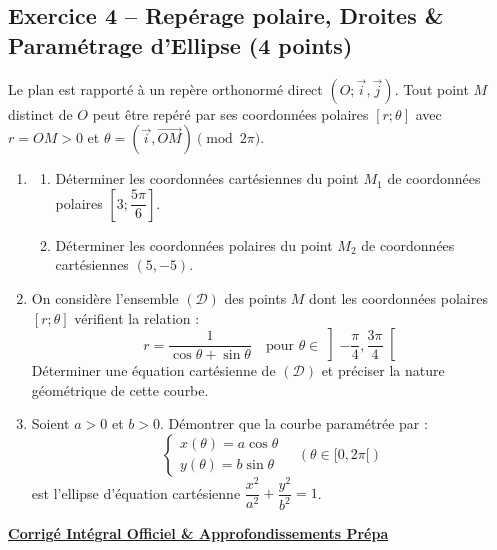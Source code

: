 \documentclass[11pt,a4paper]{article}
\begin{document}
\vspace{0.3cm}

\subsection*{Exercice 4 -- Repérage polaire, Droites \& Paramétrage d'Ellipse \hfill (4 points)}

Le plan est rapporté à un repère orthonormé direct $(O; \vec{i}, \vec{j})$. Tout point $M$ distinct de $O$ peut être repéré par ses coordonnées polaires $[r; \theta]$ avec $r = OM > 0$ et $\theta = (\vec{i}, \overrightarrow{OM}) \pmod{2\pi}$.

\begin{enumerate}
    \item 
    \begin{enumerate}
        \item Déterminer les coordonnées cartésiennes du point $M_1$ de coordonnées polaires $\left[3; \dfrac{5\pi}{6}\right]$.
        \item Déterminer les coordonnées polaires du point $M_2$ de coordonnées cartésiennes $(5, -5)$.
    \end{enumerate}
    \item On considère l'ensemble $(\mathcal{D})$ des points $M$ dont les coordonnées polaires $[r; \theta]$ vérifient la relation :
    \[
    r = \frac{1}{\cos\theta + \sin\theta} \quad \text{pour } \theta \in \left]-\frac{\pi}{4}, \frac{3\pi}{4}\right[
    \]
    Déterminer une équation cartésienne de $(\mathcal{D})$ et préciser la nature géométrique de cette courbe.
    \item Soient $a > 0$ et $b > 0$. Démontrer que la courbe paramétrée par :
    \[
    \begin{cases} x(\theta) = a \cos\theta \\ y(\theta) = b \sin\theta \end{cases} \quad (\theta \in [0, 2\pi[)
    \]
    est l'ellipse d'équation cartésienne $\dfrac{x^2}{a^2} + \dfrac{y^2}{b^2} = 1$.
\end{enumerate}

\newpage

\begin{center}
    {\Large \bfseries \color{emeraldtitle} \underline{Corrigé Intégral Officiel \& Approfondissements Prépa}}
\end{center}
\end{document}
